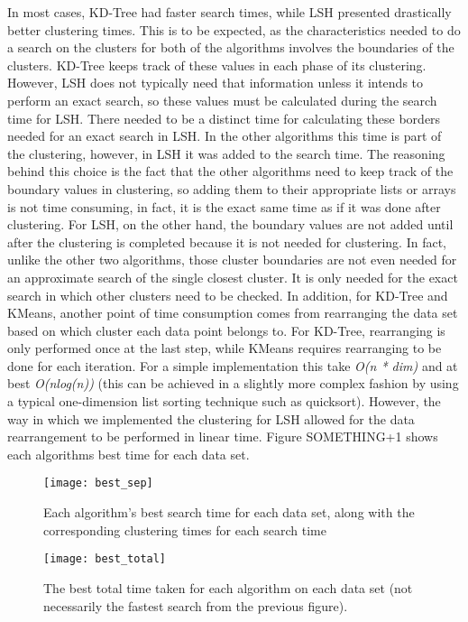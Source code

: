 \documentclass[journal]{IEEEtran}
\begin{document}
In most cases, KD-Tree had faster search times, while LSH presented drastically better clustering times. This is to be expected, as the characteristics needed to do a search on the clusters for both of the algorithms involves the boundaries of the clusters. KD-Tree keeps track of these values in each phase of its clustering. However, LSH does not typically need that information unless it intends to perform an exact search, so these values must be calculated during the search time for LSH. There needed to be a distinct time for calculating these borders needed for an exact search in LSH. In the other algorithms this time is part of the clustering, however, in LSH it was added to the search time. The reasoning behind this choice is the fact that the other algorithms need to keep track of the boundary values in clustering, so adding them to their appropriate lists or arrays is not time consuming, in fact, it is the exact same time as if it was done after clustering. For LSH, on the other hand, the boundary values are not added until after the clustering is completed because it is not needed for clustering. In fact, unlike the other two algorithms, those cluster boundaries are not even needed for an approximate search of the single closest cluster. It is only needed for the exact search in which other clusters need to be checked. In addition, for KD-Tree and KMeans, another point of time consumption comes from rearranging the data set based on which cluster each data point belongs to. For KD-Tree, rearranging is only performed once at the last step, while KMeans requires rearranging to be done for each iteration. For a simple implementation this take \textit{O(n * dim)} and at best \textit{O(nlog(n))} (this can be achieved in a slightly more complex fashion by using a typical one-dimension list sorting technique such as quicksort). However, the way in which we implemented the clustering for LSH allowed for the data rearrangement to be performed in linear time. Figure SOMETHING+1 shows each algorithms best time for each data set.

\begin{figure}[t]
	\texttt{[image: best\_sep]}
	\caption{Each algorithm's best search time for each data set, along with the corresponding clustering times for each search time}
\end{figure}
\begin{figure}[t]
	\texttt{[image: best\_total]}
	\caption{The best total time taken for each algorithm on each data set (not necessarily the fastest search from the previous figure).}
\end{figure}
\end{document}
